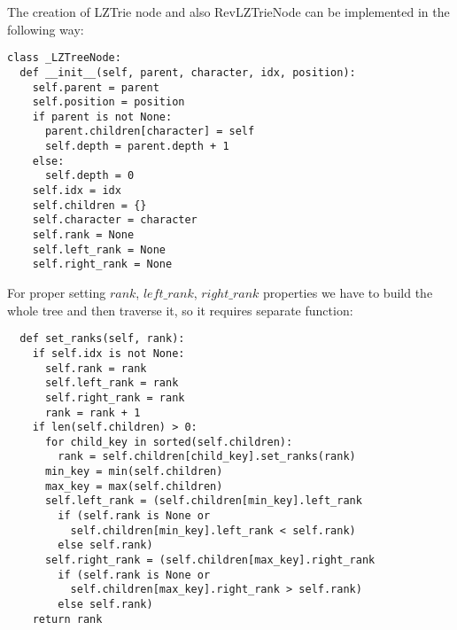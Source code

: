 \begin{center}
\end{center}

The creation of LZTrie node and also RevLZTrieNode can be implemented in the following way:

\begin{verbatim}
class _LZTreeNode:
  def __init__(self, parent, character, idx, position):
    self.parent = parent
    self.position = position
    if parent is not None:
      parent.children[character] = self
      self.depth = parent.depth + 1
    else:
      self.depth = 0
    self.idx = idx
    self.children = {}
    self.character = character
    self.rank = None
    self.left_rank = None
    self.right_rank = None
\end{verbatim}

For proper setting $rank$, $left\_rank$, $right\_rank$ properties we have to build the whole tree and then traverse it, so it requires separate function:

\begin{verbatim}
  def set_ranks(self, rank):
    if self.idx is not None:
      self.rank = rank
      self.left_rank = rank
      self.right_rank = rank
      rank = rank + 1
    if len(self.children) > 0:
      for child_key in sorted(self.children):
        rank = self.children[child_key].set_ranks(rank)
      min_key = min(self.children)
      max_key = max(self.children)
      self.left_rank = (self.children[min_key].left_rank
        if (self.rank is None or
          self.children[min_key].left_rank < self.rank)
        else self.rank)
      self.right_rank = (self.children[max_key].right_rank
        if (self.rank is None or
          self.children[max_key].right_rank > self.rank)
        else self.rank)
    return rank
\end{verbatim}

